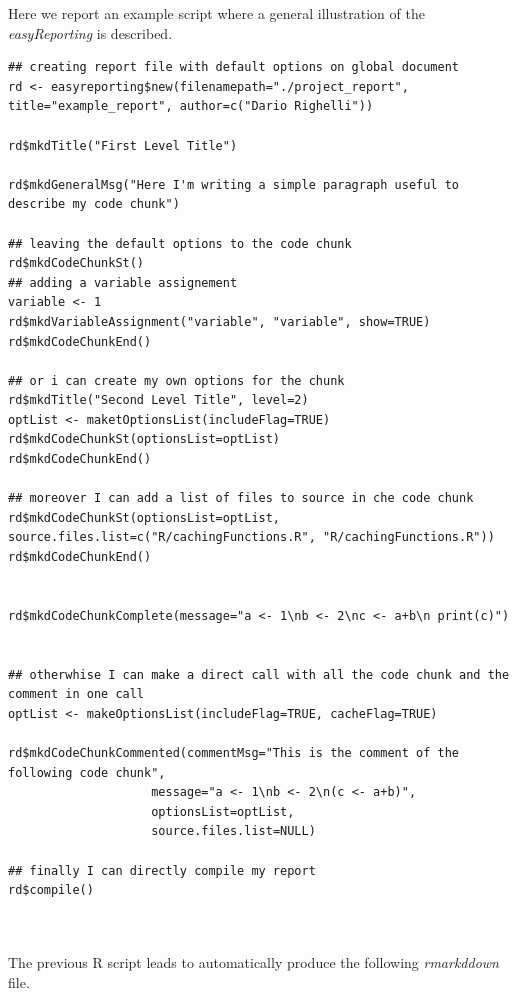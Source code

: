 Here we report an example script where a general illustration of the \textit{easyReporting} is described.

\begin{lstlisting}
## creating report file with default options on global document
rd <- easyreporting$new(filenamepath="./project_report", title="example_report", author=c("Dario Righelli"))

rd$mkdTitle("First Level Title")

rd$mkdGeneralMsg("Here I'm writing a simple paragraph useful to describe my code chunk")

## leaving the default options to the code chunk
rd$mkdCodeChunkSt()
## adding a variable assignement
variable <- 1
rd$mkdVariableAssignment("variable", "variable", show=TRUE)
rd$mkdCodeChunkEnd()

## or i can create my own options for the chunk
rd$mkdTitle("Second Level Title", level=2)
optList <- maketOptionsList(includeFlag=TRUE)
rd$mkdCodeChunkSt(optionsList=optList)
rd$mkdCodeChunkEnd()

## moreover I can add a list of files to source in che code chunk
rd$mkdCodeChunkSt(optionsList=optList, source.files.list=c("R/cachingFunctions.R", "R/cachingFunctions.R"))
rd$mkdCodeChunkEnd()


rd$mkdCodeChunkComplete(message="a <- 1\nb <- 2\nc <- a+b\n print(c)")


## otherwhise I can make a direct call with all the code chunk and the comment in one call
optList <- makeOptionsList(includeFlag=TRUE, cacheFlag=TRUE)

rd$mkdCodeChunkCommented(commentMsg="This is the comment of the following code chunk",
                    message="a <- 1\nb <- 2\n(c <- a+b)",
                    optionsList=optList,
                    source.files.list=NULL)

## finally I can directly compile my report
rd$compile()



\end{lstlisting}
 
 
 
The previous R script leads to automatically produce the following \textit{rmarkddown} file.


